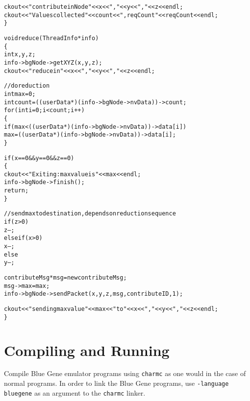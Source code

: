\documentclass[10pt]{article}
\begin{document}
\begin{alltt}
  ckout << "contribute in Node " << x << ", " << y << ", " << z << endl ;
  ckout << "Values collected " << count << ", reqCount " << reqCount << endl;
\}

void reduce(ThreadInfo *info)
\{
  int x,y,z;
  info->bgNode->getXYZ(x,y,z);
  ckout << "reduce in " << x << ", " << y << ", " << z << endl;

  //do reduction
  int max = 0 ;
  int count = ((userData*)(info->bgNode->nvData))->count ;
  for(int i=0; i<count; i++)
  \{
           if(max<((userData*)(info->bgNode->nvData))->data[i])
           max = ((userData*)(info->bgNode->nvData))->data[i] ;
  \}

  if(x==0 \&\& y==0 \&\& z==0)
  \{
         ckout << "Exiting: max value is " << max << endl ;
         info->bgNode->finish() ;
         return ;
  \}

  //send max to destination, depends on reduction sequence
  if(z>0)
   z-- ;
  else if(x>0)
   x-- ;
  else
   y-- ;

  contributeMsg *msg = new contributeMsg;
  msg->max = max;
  info->bgNode->sendPacket(x,y,z,msg,contributeID,1);

  ckout << "sending max value " << max << " to " << x << ", " << y << ", " << z << endl ;
\}
\end{alltt}

\section{Compiling and Running}

Compile Blue Gene emulator programs using {\tt charmc} as one would
in the case of normal \charmpp{} programs. In order to link the
Blue Gene programs, use \texttt{-language bluegene} as an argument
to the {\tt charmc} linker.


\end{document}
